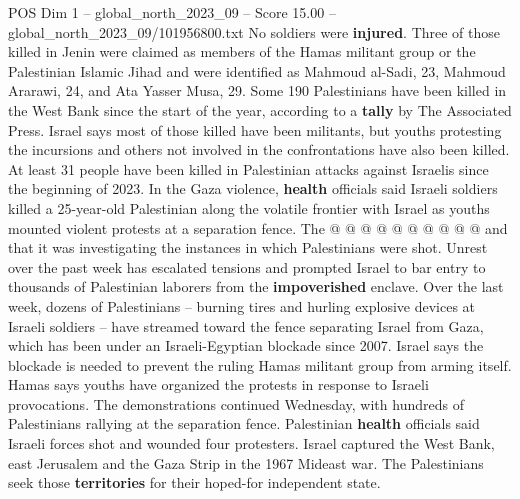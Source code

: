 \begin{textsample}{POS Dim 1 – global\_north\_2023\_09 – Score 15.00 – global\_north\_2023\_09/101956800.txt}
No soldiers were \textbf{injured}.
Three of those killed in Jenin were claimed as members of the Hamas militant group or the Palestinian Islamic Jihad and were identified as Mahmoud al-Sadi, 23, Mahmoud Ararawi, 24, and Ata Yasser Musa, 29.
Some 190 Palestinians have been killed in the West Bank since the start of the year, according to a \textbf{tally} by The Associated Press.
Israel says most of those killed have been militants, but youths protesting the incursions and others not involved in the confrontations have also been killed.
At least 31 people have been killed in Palestinian attacks against Israelis since the beginning of 2023.
In the Gaza violence, \textbf{health} officials said Israeli soldiers killed a 25-year-old Palestinian along the volatile frontier with Israel as youths mounted violent protests at a separation fence.
The @ @ @ @ @ @ @ @ @ @ and that it was investigating the instances in which Palestinians were shot.
Unrest over the past week has escalated tensions and prompted Israel to bar entry to thousands of Palestinian laborers from the \textbf{impoverished} enclave.
Over the last week, dozens of Palestinians -- burning tires and hurling explosive devices at Israeli soldiers -- have streamed toward the fence separating Israel from Gaza, which has been under an Israeli-Egyptian blockade since 2007.
Israel says the blockade is needed to prevent the ruling Hamas militant group from arming itself.
Hamas says youths have organized the protests in response to Israeli provocations.
The demonstrations continued Wednesday, with hundreds of Palestinians rallying at the separation fence.
Palestinian \textbf{health} officials said Israeli forces shot and wounded four protesters.
Israel captured the West Bank, east Jerusalem and the Gaza Strip in the 1967 Mideast war.
The Palestinians seek those \textbf{territories} for their hoped-for independent state.

\end{textsample}
